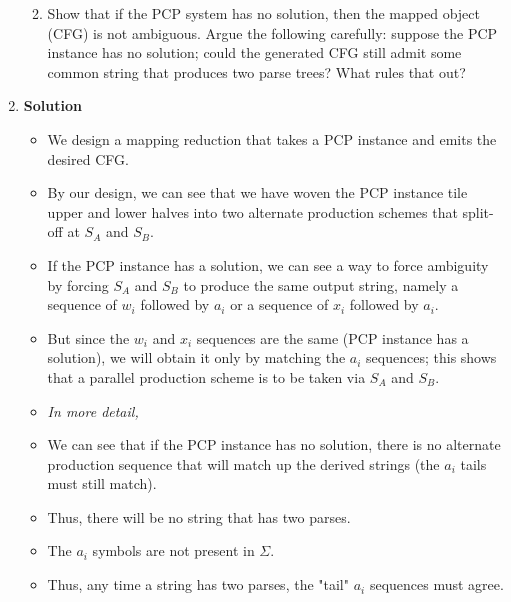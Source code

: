 \documentclass[12pt]{article}
\begin{document}
\begin{enumerate}
\begin{enumerate}
\begin{enumerate}
    \end{enumerate}
    
  \item Show that if the PCP system has no solution,
    then the mapped object (CFG)
    is not ambiguous.
    Argue the following carefully: suppose the PCP instance has no solution;
    could the generated CFG still admit some common string that produces
    two parse trees? What rules that out?



  \end{enumerate}

\item[] {\bf Solution}

  
\begin{itemize}
\item We design a mapping reduction that takes a PCP instance and emits the desired CFG. 

\item By our design, we can see that we have woven the PCP instance tile upper
  and lower halves into two alternate production schemes that split-off at $S_A$ and $S_B$. 

\item If the PCP instance has a solution, we can see a way to force ambiguity by forcing $S_A$ 
  and $S_B$ to produce the same output string,
  namely a sequence of $w_i$ followed by $a_i$ or  a sequence of $x_i$ followed by $a_i$. 

\item But since the $w_i$ and $x_i$ sequences are the same (PCP instance has a solution), we will obtain it only by matching the $a_i$ sequences; this shows that a parallel production scheme is to be taken via $S_A$ and $S_B$.

\item[] {\em In more detail,}

\item We can 
  see that if the PCP instance has no solution, there is no alternate production sequence that will match up the derived strings (the $a_i$ tails must still match). 

\item Thus, there will be no string that has two parses.

\item The $a_i$ symbols are not present in $\Sigma$.
 
\item Thus, any time a string has two parses, the "tail" $a_i$ sequences
  must agree.
  

\end{itemize}
\end{enumerate}
\end{document}
